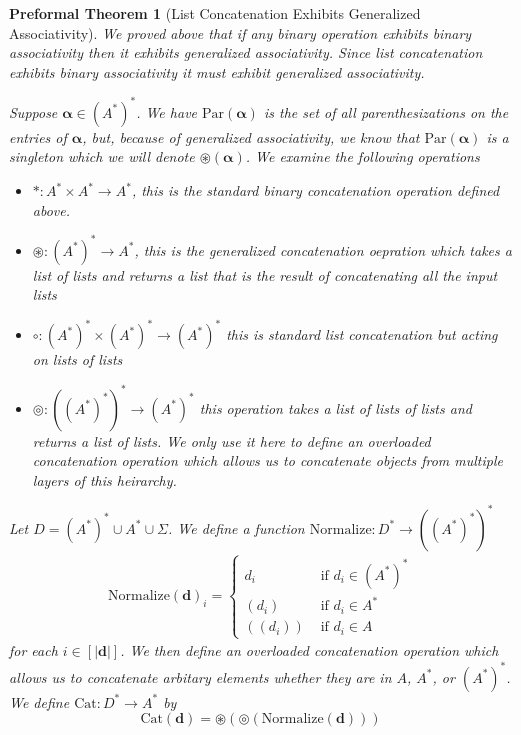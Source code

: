 \documentclass[oneside, 12pt]{book}
\theoremstyle{break}
\newtheorem{preformal definition}[definition]{Preformal Definition}
\newtheorem{preformal theorem}[theorem]{Preformal Theorem}
\newcommand{\bv}[1]{\boldsymbol{#1}}
\newcommand{\norm}[1]{\left|#1\right|}
\begin{document}
			\begin{preformal theorem}[List Concatenation Exhibits Generalized Associativity]
				We proved above that if any binary operation exhibits binary associativity then it exhibits generalized associativity.
				Since list concatenation exhibits binary associativity it must exhibit generalized associativity.
				
				Suppose $\bv{\alpha} \in (A^*)^*$.
				We have $\text{Par}(\bv{\alpha})$ is the set of all parenthesizations on the entries of $\bv{\alpha}$, but, because of generalized associativity, we know that $\text{Par}(\bv{\alpha})$ is a singleton which we will denote $\circledast(\bv{\alpha})$.
				We examine the following operations
				\begin{itemize}
					\item{$\ast: A^* \times A^* \to A^*$, this is the standard binary concatenation operation defined above.}
					\item{$\circledast: (A^*)^* \to A^*$, this is the generalized concatenation oepration which takes a list of lists and returns a list that is the result of concatenating all the input lists}
					\item{$\circ: (A^*)^* \times (A^*)^* \to (A^*)^*$ this is standard list concatenation but acting on lists of lists}
					\item{$\circledcirc: ((A^*)^*)^* \to (A^*)^*$ this operation takes a list of lists of lists and returns a list of lists. We only use it here to define an overloaded concatenation operation which allows us to concatenate objects from multiple layers of this heirarchy.}
				\end{itemize}
				
				Let $D = (A^*)^* \cup A^* \cup \Sigma$.
				We define a function $\text{Normalize}: D^* \to ((A^*)^*)^*$
				\begin{align*}
					\text{Normalize}(\bv{d})_i = \begin{cases}
						d_i &\text{ if } d_i \in (A^*)^*\\
						(d_i) & \text{ if } d_i \in A^*\\
						((d_i)) & \text{ if } d_i \in A
					\end{cases}
				\end{align*}
				for each $i\in [\norm{\bv{d}}]$.
				We then define an overloaded concatenation operation which allows us to concatenate arbitary elements whether they are in $A$, $A^*$, or $(A^*)^*$.
				We define $\text{Cat}: D^* \to A^*$ by 
				\begin{equation*}
					\text{Cat}(\bv{d}) = \circledast(\circledcirc(\text{Normalize}(\bv{d})))
				\end{equation*}
				

\end{preformal theorem}
\end{document}
